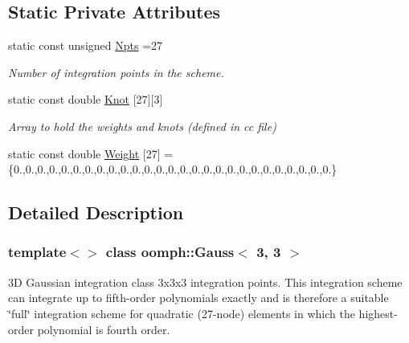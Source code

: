 \subsection*{Static Private Attributes}
\begin{DoxyCompactItemize}
\item 
static const unsigned \hyperlink{classoomph_1_1Gauss_3_013_00_013_01_4_ae94ce1237b25d8fde9af9e0484159e13}{Npts} =27
\begin{DoxyCompactList}\small\item\em Number of integration points in the scheme. \end{DoxyCompactList}\item 
static const double \hyperlink{classoomph_1_1Gauss_3_013_00_013_01_4_a3598fd030309f4a407559c5017c1f5d2}{Knot} \mbox{[}27\mbox{]}\mbox{[}3\mbox{]}
\begin{DoxyCompactList}\small\item\em Array to hold the weights and knots (defined in cc file) \end{DoxyCompactList}\item 
static const double \hyperlink{classoomph_1_1Gauss_3_013_00_013_01_4_a8c3349e8cfafc050a57a5759151cafbb}{Weight} \mbox{[}27\mbox{]} = \{0.,0.,0.,0.,0.,0.,0.,0.,0.,0.,0.,0.,0.,0.,0.,0.,0.,0.,0.,0.,0.,0.,0.,0.,0.,0.,0.\}
\end{DoxyCompactItemize}


\subsection{Detailed Description}
\subsubsection*{template$<$$>$\newline
class oomph\+::\+Gauss$<$ 3, 3 $>$}

3D Gaussian integration class 3x3x3 integration points. This integration scheme can integrate up to fifth-\/order polynomials exactly and is therefore a suitable \char`\"{}full\char`\"{} integration scheme for quadratic (27-\/node) elements in which the highest-\/order polynomial is fourth order. 

